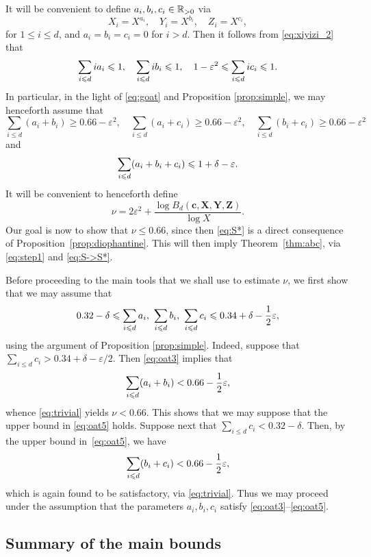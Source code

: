 It will be convenient to define  $a_i,b_i,c_i\in \mathbb{R}_{>0}$ via
$$
X_i=X^{a_i}, \quad  Y_i=X^{b_i}, \quad Z_i=X^{c_i},
$$
for $1\leq i\leq d$, and $a_i=b_i=c_i=0$ for $i>d$. Then it follows from
\eqref{eq:xiyizi_2} that
\begin{equation}\label{eq:oat1}
\sum_{i\leqslant d} ia_i \leqslant 1, \quad  \sum_{i\leqslant d} ib_i  \leqslant 1, \quad   1-\varepsilon^2\leqslant \sum_{i\leqslant d} ic_i \leqslant 1.
\end{equation}
In particular, in the light of \eqref{eq:goat} and
 Proposition \ref{prop:simple}, we
may henceforth assume that
\begin{equation}\label{eq:oat4}
\sum_{i\leq d} (a_i+b_i)\geq 0.66-\varepsilon^2,\quad \sum_{i\leq d} (a_i+c_i)\geq 0.66-\varepsilon^2,\quad
\sum_{i\leq d} (b_i+c_i) \geq  0.66-\varepsilon^2
\end{equation}
and
\begin{equation}\label{eq:oat3}
\sum_{i\leqslant d} (a_i+b_i+c_i) \leqslant 1+\delta-\varepsilon.
\end{equation}
It will be convenient to henceforth define
$$
\nu=2\varepsilon^2+\frac{\log B_d(\mathbf{c},\mathbf{X},\mathbf{Y},\mathbf{Z})}{\log X}.
$$
Our goal is now to show that $\nu\le 0.66$, since then
\eqref{eq:S*}
is a direct consequence of
Proposition~\ref{prop:diophantine}.
This will then imply
Theorem~\ref{thm:abc}, via \eqref{eq:step1} and \eqref{eq:S->S*}.


Before proceeding to the main tools that we shall use to estimate $\nu$, we first show that we may assume that  \begin{equation}\label{eq:oat5}
0.32 - \delta \leqslant \sum_{i\leqslant d} a_i ,~  \sum_{i\leqslant d} b_i  ,~ \sum_{i\leqslant d} c_i \leqslant 0.34 + \delta-
\frac{1}{2}\varepsilon,
\end{equation}
using the argument of Proposition \ref{prop:simple}. Indeed, suppose that
$\sum_{i\leq d} c_i> 0.34 + \delta-\varepsilon/2$. Then \eqref{eq:oat3} implies that
 $$
 \sum_{i\leqslant d} (a_i + b_i)<
 0.66-\frac{1}{2}\varepsilon,
 $$
 whence
  \eqref{eq:trivial} yields $\nu< 0.66$. This shows that we may suppose that the upper bound in \eqref{eq:oat5} holds.
  Suppose next that
  $\sum_{i\leq d} c_i< 0.32 - \delta$. Then, by the upper bound in~\eqref{eq:oat5}, we have
   $$
 \sum_{i\leqslant d} (b_i + c_i)< 0.66-\frac{1}{2}\varepsilon,
 $$
which is again found to be satisfactory, via \eqref{eq:trivial}. Thus we may proceed under the assumption that the parameters $a_i,b_i,c_i$ satisfy \eqref{eq:oat3}--\eqref{eq:oat5}.


\subsection{Summary of the main bounds}

